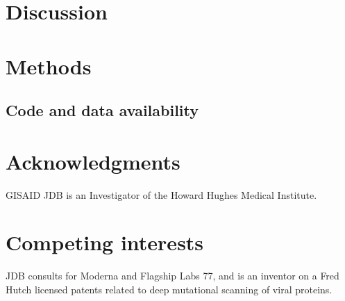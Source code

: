 \documentclass[9pt,twocolumn,twoside]{gsajnl_modified}
\begin{document}
\subsection{}

\section{Discussion}


{\small

\section{Methods}
\subsection{Code and data availability}

\section{Acknowledgments}
{\color{red} GISAID}
JDB is an Investigator of the Howard Hughes Medical Institute.

\section{Competing interests}
JDB consults for Moderna and Flagship Labs 77, and is an inventor on a Fred Hutch licensed patents related to deep mutational scanning of viral proteins.

}


\end{document}

